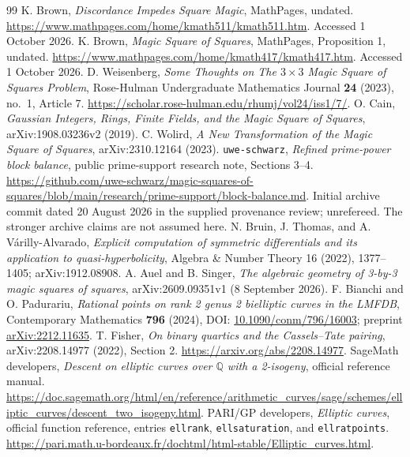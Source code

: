 \documentclass[11pt,letterpaper]{article}
\theoremstyle{definition}\newtheorem{definition}[theorem]{Definition}
\theoremstyle{remark}\newtheorem{remark}[theorem]{Remark}
\newcommand{\Q}{\mathbb Q}\newcommand{\Z}{\mathbb Z}\newcommand{\R}{\mathbb R}
\begin{document}
\clearpage
{}
\begin{thebibliography}{99}
\small
{} K. Brown, \emph{Discordance Impedes Square Magic}, MathPages, undated. \url{https://www.mathpages.com/home/kmath511/kmath511.htm}. Accessed 1 October 2026.
 K. Brown, \emph{Magic Square of Squares}, MathPages, Proposition 1, undated. \url{https://www.mathpages.com/home/kmath417/kmath417.htm}. Accessed 1 October 2026.
 D. Weisenberg, \emph{Some Thoughts on The $3\times3$ Magic Square of Squares Problem}, Rose-Hulman Undergraduate Mathematics Journal \textbf{24} (2023), no.~1, Article 7. \url{https://scholar.rose-hulman.edu/rhumj/vol24/iss1/7/}.
 O. Cain, \emph{Gaussian Integers, Rings, Finite Fields, and the Magic Square of Squares}, arXiv:1908.03236v2 (2019).
 C. Wolird, \emph{A New Transformation of the Magic Square of Squares}, arXiv:2310.12164 (2023).
 \texttt{uwe-schwarz}, \emph{Refined prime-power block balance}, public prime-support research note, Sections 3--4. \url{https://github.com/uwe-schwarz/magic-squares-of-squares/blob/main/research/prime-support/block-balance.md}. Initial archive commit dated 20 August 2026 in the supplied provenance review; unrefereed. The stronger archive claims are not assumed here.
 N. Bruin, J. Thomas, and A. V\'arilly-Alvarado, \emph{Explicit computation of symmetric differentials and its application to quasi-hyperbolicity}, Algebra \& Number Theory 16 (2022), 1377--1405; arXiv:1912.08908.
 A. Auel and B. Singer, \emph{The algebraic geometry of 3-by-3 magic squares of squares}, arXiv:2609.09351v1 (8 September 2026).
 F. Bianchi and O. Padurariu, \emph{Rational points on rank 2 genus 2 bielliptic curves in the LMFDB}, Contemporary Mathematics \textbf{796} (2024), DOI: \href{https://doi.org/10.1090/conm/796/16003}{10.1090/conm/796/16003}; preprint \href{https://arxiv.org/abs/2212.11635}{arXiv:2212.11635}.
 T. Fisher, \emph{On binary quartics and the Cassels--Tate pairing}, arXiv:2208.14977 (2022), Section 2. \url{https://arxiv.org/abs/2208.14977}.
 SageMath developers, \emph{Descent on elliptic curves over $\Q$ with a 2-isogeny}, official reference manual. \url{https://doc.sagemath.org/html/en/reference/arithmetic_curves/sage/schemes/elliptic_curves/descent_two_isogeny.html}.
 PARI/GP developers, \emph{Elliptic curves}, official function reference, entries \texttt{ellrank}, \texttt{ellsaturation}, and \texttt{ellratpoints}. \url{https://pari.math.u-bordeaux.fr/dochtml/html-stable/Elliptic_curves.html}.

\end{thebibliography}
\end{document}
